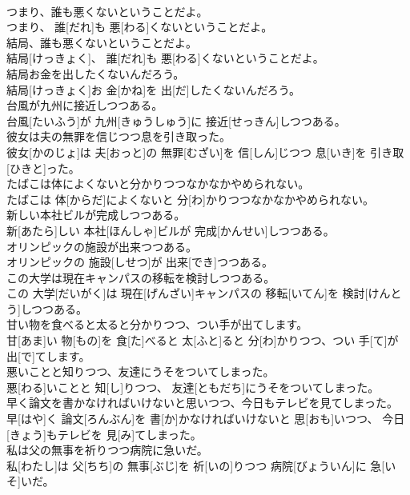\documentclass[8pt]{extreport}
\begin{document}
\begin{CJK}{UTF8}{min}
\\	つまり、誰も悪くないということだよ。	
\\	つまり、 誰[だれ]も 悪[わる]くないということだよ。
\\	結局、誰も悪くないということだよ。	
\\	結局[けっきょく]、 誰[だれ]も 悪[わる]くないということだよ。
\\	結局お金を出したくないんだろう。	
\\	結局[けっきょく]お 金[かね]を 出[だ]したくないんだろう。
\\	台風が九州に接近しつつある。	
\\	台風[たいふう]が 九州[きゅうしゅう]に 接近[せっきん]しつつある。
\\	彼女は夫の無罪を信じつつ息を引き取った。	
\\	彼女[かのじょ]は 夫[おっと]の 無罪[むざい]を 信[しん]じつつ 息[いき]を 引き取[ひきと]った。
\\	たばこは体によくないと分かりつつなかなかやめられない。	
\\	たばこは 体[からだ]によくないと 分[わ]かりつつなかなかやめられない。
\\	新しい本社ビルが完成しつつある。	
\\	新[あたら]しい 本社[ほんしゃ]ビルが 完成[かんせい]しつつある。
\\	オリンピックの施設が出来つつある。	
\\	オリンピックの 施設[しせつ]が 出来[でき]つつある。
\\	この大学は現在キャンパスの移転を検討しつつある。	
\\	この 大学[だいがく]は 現在[げんざい]キャンパスの 移転[いてん]を 検討[けんとう]しつつある。
\\	甘い物を食べると太ると分かりつつ、つい手が出てします。	
\\	甘[あま]い 物[もの]を 食[た]べると 太[ふと]ると 分[わ]かりつつ、つい 手[て]が 出[で]てします。
\\	悪いことと知りつつ、友達にうそをついてしまった。	
\\	悪[わる]いことと 知[し]りつつ、 友達[ともだち]にうそをついてしまった。
\\	早く論文を書かなければいけないと思いつつ、今日もテレビを見てしまった。	
\\	早[はや]く 論文[ろんぶん]を 書[か]かなければいけないと 思[おも]いつつ、 今日[きょう]もテレビを 見[み]てしまった。
\\	私は父の無事を祈りつつ病院に急いだ。	
\\	私[わたし]は 父[ちち]の 無事[ぶじ]を 祈[いの]りつつ 病院[びょういん]に 急[いそ]いだ。

\end{CJK}
\end{document}
